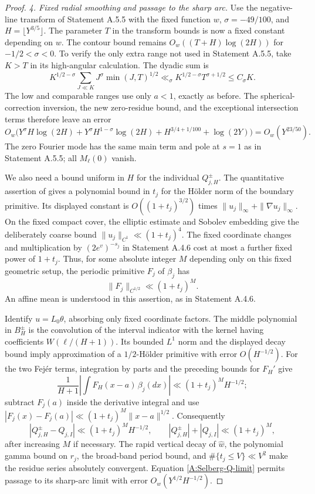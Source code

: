 \begin{proof}
\emph{4. Fixed radial smoothing and passage to the sharp arc.}
Use the negative-line transform of Statement A.5.5 with the fixed
function $w$, $\sigma=-49/100$, and $H=\lfloor Y^{3/5}\rfloor$.
The parameter $T$ in the transform bounds is now a fixed
constant depending on $w$. The contour bound remains
$O_w((T+H)\log(2H))$ for $-1/2<\sigma<0$.
To verify the only extra range not used in Statement A.5.5,
take $K>T$ in its high-angular calculation. The dyadic sum is
\[
 K^{1/2-\sigma}\sum_{J\ll K}J^\sigma\min(J,T)^{1/2}
 \ll_\sigma K^{1/2-\sigma}T^{\sigma+1/2}\leq C_\sigma K.
\]
The low and comparable ranges use only $a<1$, exactly as before.
The spherical-correction inversion, the new zero-residue bound,
and the exceptional intersection terms therefore leave an error
\[
 O_w\bigl(Y^\sigma H\log(2H)
          +Y^\sigma H^{1-\sigma}\log(2H)
          +H^{3/4+1/100}+\log(2Y)\bigr)
   =O_w(Y^{23/50}).
\]
The zero Fourier mode has the same main term and pole at $s=1$
as in Statement A.5.5; all $M_\ell(0)$ vanish.

We also need a bound uniform in $H$ for the individual
$Q_{j,H}^\pm$. The quantitative assertion of
\cite[Theorem 7.1 and Section 7.1]{AnantharamanZelditch2012}
gives a polynomial bound in $t_j$ for the H\"older norm of
the boundary primitive. Its displayed constant is
$O((1+t_j)^{3/2})$ times
$\|u_j\|_\infty+\|\nabla u_j\|_\infty$.
On the fixed compact cover, the elliptic estimate and Sobolev
embedding give the deliberately coarse bound
$\|u_j\|_{C^1}\ll(1+t_j)^4$.
The fixed coordinate changes and multiplication by
$(2e^v)^{-s_j}$ in Statement A.4.6 cost at most a further fixed
power of $1+t_j$. Thus, for some absolute integer $M$ depending
only on this fixed geometric setup, the periodic primitive
$F_j$ of $\beta_j$ has
\[
 \|F_j\|_{C^{1/2}}\ll(1+t_j)^M.
\]
An affine mean is understood in this assertion, as in
Statement A.4.6.

Identify $u=L_0\theta$, absorbing only fixed coordinate factors.
The middle polynomial in $B_H^\pm$ is the convolution of the
interval indicator with the kernel having coefficients
$W(\ell/(H+1))$. Its bounded $L^1$ norm and the displayed
decay bound imply approximation of a $1/2$-H\"older primitive
with error $O(H^{-1/2})$. For the two Fej\'er terms,
integration by parts and the preceding bounds for $F_H'$ give
\[
 \frac1{H+1}\left|\int F_H(x-a)\,\beta_j(dx)\right|
 \ll (1+t_j)^M H^{-1/2};
\]
subtract $F_j(a)$ inside the derivative integral and use
$|F_j(x)-F_j(a)|\ll(1+t_j)^M\|x-a\|^{1/2}$.
Consequently
\begin{equation}\label{A:Selberg-Q-limit}
 |Q_{j,H}^\pm-Q_{j,I}|
       \ll(1+t_j)^M H^{-1/2},
 \qquad |Q_{j,H}^\pm|+|Q_{j,I}|\ll(1+t_j)^M,
\end{equation}
after increasing $M$ if necessary.
The rapid vertical decay of $\widehat w$, the polynomial gamma
bound on $r_j$, the broad-band period bound, and
$\#\{t_j\leq V\}\ll V^2$ make the residue series absolutely
convergent. Equation \eqref{A:Selberg-Q-limit} permits passage
to its sharp-arc limit with error $O_w(Y^{1/2}H^{-1/2})$.


\end{proof}
